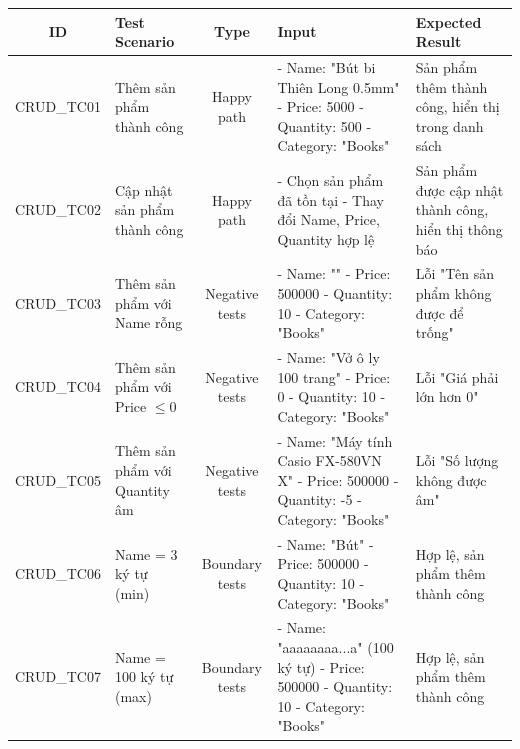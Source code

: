 \documentclass[a4paper,12pt]{article}
\begin{document}
\begin{table}[H]
\centering
\begin{tabularx}{\textwidth}{|c|>{\raggedright\arraybackslash}X|c|>{\raggedright\arraybackslash}X|>{\raggedright\arraybackslash}X|}
\hline
\textbf{ID} & \textbf{Test Scenario} & \textbf{Type} & \textbf{Input} & \textbf{Expected Result} \\ \hline

CRUD\_TC01 & Thêm sản phẩm thành công & Happy path &
- Name: "Bút bi Thiên Long 0.5mm" \newline
- Price: 5000 \newline
- Quantity: 500 \newline
- Category: "Books" & Sản phẩm thêm thành công, hiển thị trong danh sách \\ \hline

CRUD\_TC02 & Cập nhật sản phẩm thành công & Happy path &
- Chọn sản phẩm đã tồn tại \newline
- Thay đổi Name, Price, Quantity hợp lệ & Sản phẩm được cập nhật thành công, hiển thị thông báo \\ \hline

CRUD\_TC03 & Thêm sản phẩm với Name rỗng & Negative tests &
- Name: "" \newline
- Price: 500000 \newline
- Quantity: 10 \newline
- Category: "Books" & Lỗi "Tên sản phẩm không được để trống" \\ \hline

CRUD\_TC04 & Thêm sản phẩm với Price $\leq 0$ & Negative tests &
- Name: "Vở ô ly 100 trang" \newline
- Price: 0 \newline
- Quantity: 10 \newline
- Category: "Books" & Lỗi "Giá phải lớn hơn 0" \\ \hline

CRUD\_TC05 & Thêm sản phẩm với Quantity âm & Negative tests &
- Name: "Máy tính Casio FX-580VN X" \newline
- Price: 500000 \newline
- Quantity: -5 \newline
- Category: "Books" & Lỗi "Số lượng không được âm" \\ \hline

CRUD\_TC06 & Name = 3 ký tự (min) & Boundary tests &
- Name: "Bút" \newline
- Price: 500000 \newline
- Quantity: 10 \newline
- Category: "Books" & Hợp lệ, sản phẩm thêm thành công \\ \hline

CRUD\_TC07 & Name = 100 ký tự (max) & Boundary tests &
- Name: "aaaaaaaa...a" (100 ký tự) \newline
- Price: 500000 \newline
- Quantity: 10 \newline
- Category: "Books" & Hợp lệ, sản phẩm thêm thành công \\ \hline

\end{tabularx}
\end{table}
\end{document}

